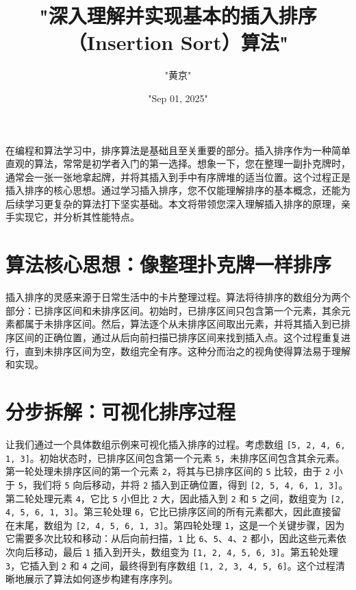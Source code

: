 \title{"深入理解并实现基本的插入排序（Insertion Sort）算法"}
\author{"黄京"}
\date{"Sep 01, 2025"}
\maketitle
在编程和算法学习中，排序算法是基础且至关重要的部分。插入排序作为一种简单直观的算法，常常是初学者入门的第一选择。想象一下，您在整理一副扑克牌时，通常会一张一张地拿起牌，并将其插入到手中有序牌堆的适当位置。这个过程正是插入排序的核心思想。通过学习插入排序，您不仅能理解排序的基本概念，还能为后续学习更复杂的算法打下坚实基础。本文将带领您深入理解插入排序的原理，亲手实现它，并分析其性能特点。\par
\chapter{算法核心思想：像整理扑克牌一样排序}
插入排序的灵感来源于日常生活中的卡片整理过程。算法将待排序的数组分为两个部分：已排序区间和未排序区间。初始时，已排序区间只包含第一个元素，其余元素都属于未排序区间。然后，算法逐个从未排序区间取出元素，并将其插入到已排序区间的正确位置，通过从后向前扫描已排序区间来找到插入点。这个过程重复进行，直到未排序区间为空，数组完全有序。这种分而治之的视角使得算法易于理解和实现。\par
\chapter{分步拆解：可视化排序过程}
让我们通过一个具体数组示例来可视化插入排序的过程。考虑数组 \texttt{[5, 2, 4, 6, 1, 3]}。初始状态时，已排序区间包含第一个元素 \texttt{5}，未排序区间包含其余元素。第一轮处理未排序区间的第一个元素 \texttt{2}，将其与已排序区间的 \texttt{5} 比较，由于 \texttt{2} 小于 \texttt{5}，我们将 \texttt{5} 向后移动，并将 \texttt{2} 插入到正确位置，得到 \texttt{[2, 5, 4, 6, 1, 3]}。第二轮处理元素 \texttt{4}，它比 \texttt{5} 小但比 \texttt{2} 大，因此插入到 \texttt{2} 和 \texttt{5} 之间，数组变为 \texttt{[2, 4, 5, 6, 1, 3]}。第三轮处理 \texttt{6}，它比已排序区间的所有元素都大，因此直接留在末尾，数组为 \texttt{[2, 4, 5, 6, 1, 3]}。第四轮处理 \texttt{1}，这是一个关键步骤，因为它需要多次比较和移动：从后向前扫描，\texttt{1} 比 \texttt{6}、\texttt{5}、\texttt{4}、\texttt{2} 都小，因此这些元素依次向后移动，最后 \texttt{1} 插入到开头，数组变为 \texttt{[1, 2, 4, 5, 6, 3]}。第五轮处理 \texttt{3}，它插入到 \texttt{2} 和 \texttt{4} 之间，最终得到有序数组 \texttt{[1, 2, 3, 4, 5, 6]}。这个过程清晰地展示了算法如何逐步构建有序序列。\par
